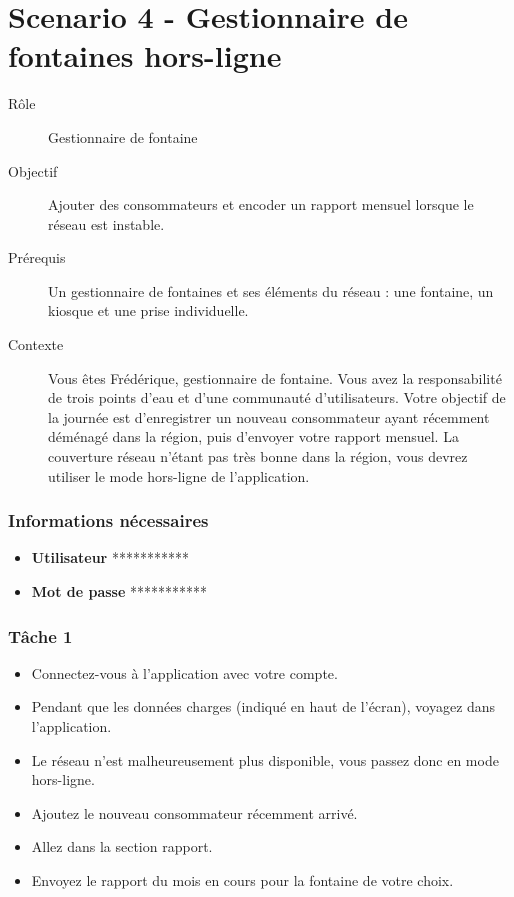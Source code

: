 \documentclass{EPL-master-thesis-covers-FR}
\begin{document}
			\section*{Scenario 4 - Gestionnaire de fontaines hors-ligne}
				\begin{description}
					\item[Rôle] Gestionnaire de fontaine 
					\item[Objectif] Ajouter des consommateurs et encoder un rapport mensuel lorsque le réseau est instable. 
					\item[Prérequis] Un gestionnaire de fontaines et ses éléments du réseau : une fontaine, un kiosque et une prise individuelle. 
					\item[Contexte] Vous êtes Frédérique, gestionnaire de fontaine. Vous avez la responsabilité de trois points d’eau et d’une communauté d’utilisateurs. Votre objectif de la journée est d’enregistrer un nouveau consommateur ayant récemment déménagé dans la région, puis d’envoyer votre rapport mensuel. La couverture réseau n’étant pas très bonne dans la région, vous devrez utiliser le mode hors-ligne de l’application. 
				\end{description}
							
				\subsubsection*{Informations nécessaires}
					\begin{itemize}[noitemsep, label={}]
						\item \textbf{Utilisateur} ***********
						\item \textbf{Mot de passe} ***********
					\end{itemize}
					
				\subsubsection*{Tâche 1}
					\begin{itemize}
						\item Connectez-vous à l'application avec votre compte. 
						\item Pendant que les données charges (indiqué en haut de l’écran), voyagez dans l’application. 
						\item Le réseau n'est malheureusement plus disponible, vous passez donc en mode hors-ligne. 
						\item Ajoutez le nouveau consommateur récemment arrivé. 
						\item Allez dans la section rapport. 
						\item Envoyez le rapport du mois en cours pour la fontaine de votre choix.
					\end{itemize}
					
\end{document}
